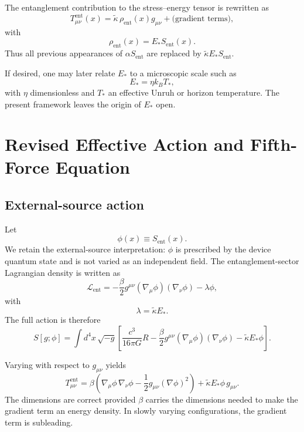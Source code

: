 \documentclass[11pt]{article}
\begin{document}
The entanglement contribution to the stress--energy tensor is rewritten as
\begin{equation}
T^{\mathrm{ent}}_{\mu\nu}(x) = \tilde{\kappa}\,\rho_{\mathrm{ent}}(x) g_{\mu\nu} + \text{(gradient terms)},
\end{equation}
with
\begin{equation}
\rho_{\mathrm{ent}}(x) = E_* S_{\mathrm{ent}}(x).
\end{equation}
Thus all previous appearances of $\alpha S_{\mathrm{ent}}$ are replaced by $\tilde{\kappa} E_* S_{\mathrm{ent}}$.

If desired, one may later relate $E_*$ to a microscopic scale such as
\begin{equation}
E_* = \eta k_B T_*,
\end{equation}
with $\eta$ dimensionless and $T_*$ an effective Unruh or horizon temperature. The present framework leaves the origin of $E_*$ open.

\section{Revised Effective Action and Fifth-Force Equation}

\subsection{External-source action}

Let
\begin{equation}
\phi(x) \equiv S_{\mathrm{ent}}(x).
\end{equation}
We retain the external-source interpretation: $\phi$ is prescribed by the device quantum state and is not varied as an independent field. The entanglement-sector Lagrangian density is written as
\begin{equation}
\mathcal{L}_{\mathrm{ent}} = -\frac{\beta}{2} g^{\mu\nu}(\nabla_\mu\phi)(\nabla_\nu\phi) - \lambda\phi,
\end{equation}
with
\begin{equation}
\lambda = \tilde{\kappa} E_*.
\end{equation}
The full action is therefore
\begin{equation}
S[g;\phi] = \int d^4x\,\sqrt{-g}\left[\frac{c^3}{16\pi G}R - \frac{\beta}{2} g^{\mu\nu}(\nabla_\mu\phi)(\nabla_\nu\phi) - \tilde{\kappa} E_*\phi\right].
\end{equation}

Varying with respect to $g_{\mu\nu}$ yields
\begin{equation}
T^{\mathrm{ent}}_{\mu\nu} = \beta\left(\nabla_\mu\phi\,\nabla_\nu\phi - \frac{1}{2}g_{\mu\nu}(\nabla\phi)^2\right) + \tilde{\kappa} E_*\phi\, g_{\mu\nu}.
\end{equation}
The dimensions are correct provided $\beta$ carries the dimensions needed to make the gradient term an energy density. In slowly varying configurations, the gradient term is subleading.
\end{document}
